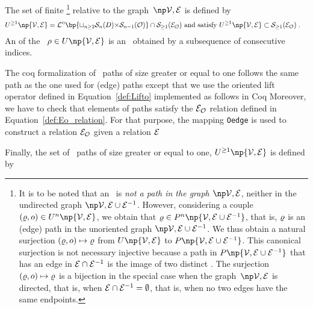 \documentclass[12pt]{article}
\begin{document}
{{{The set of finite \undirectedEdgePaths\footnote{%
  It is to be noted that an \undirectedEdgePath\ is \emph{not a path in the graph
    $\npOrientedGraph$}, neither in the undirected graph $\npUnorientedGraph$.
  However, considering a couple $(\path,\orient)\in \UPATH^n\np{\OrientedGraph}$, we obtain that
  $\path \in \PATH^n\np{\UnorientedGraph}$,
  that is, $\varrho$ is an (edge) path in the unoriented graph
  \( \npUnorientedGraph \).
  We thus obtain a natural surjection
  $(\varrho,o)\mapsto \varrho$
    from $\UPATH\np{\OrientedGraph}$ to $\PATH\np{\UnorientedGraph}$.
    This canonical surjection is not necessary injective because
    a path in $\PATH\np{\UnorientedGraph}$ that has an edge in ${\cal E} \cap {\cal E}^{-1}$
    is the image of two distinct \undirectedEdgePaths.
    The surjection $(\varrho,o)\mapsto \varrho$ 
    is a bijection in the special case when 
    the graph~\( \npOrientedGraph \) is directed,
    that is, when ${\cal E} \cap {\cal E}^{-1}=\emptyset$, that is, 
    when no two edges have the same endpoints. 
  }
  relative to the graph~$\npOrientedGraph$ 
  is defined by
\begin{align}
  \UPATH^{\ge 1}\np{\OrientedGraph}
  &=
    \Lifto \bp{\sqcup_{n\ge 2} \Sequence_{n}(\Set){\times}\Sequence_{n-1}(\Orientation)}
    \cap \Sequence_{\ge 1}(\EDGEo)
    \text{ and satisfy } \UPATH^{\ge 1}\np{\OrientedGraph}  \subset \Sequence_{\ge 1}(\EDGEo) 
    \eqfinp
    \label{def:eopaths_gt1}
\end{align}
An \emph{\undirectedEdgeSubPath} of the \undirectedEdgePath~$\UndirectedPath
\in\UPATH\np{\OrientedGraph}$ is an \undirectedEdgePath\ obtained by a
subsequence of consecutive indices. 

The coq formalization of \undirectedEdgePaths\ paths of size greater or equal to
one follows the same path as the one used for (edge) paths except that we use
the oriented lift operator defined in Equation~\eqref{def:Lifto} implemented as 
follows in Coq
{\small {}}
Moreover, we have to
check that elements of paths satisfy the ${{\cal E}}_{\cal O}$ relation defined in
Equation~\eqref{def:Eo_relation}. For that purpose,  the mapping \texttt{Oedge} is used to
construct a relation ${{\cal E}}_{\cal O}$ given a relation ${\cal E}$
{\small {}
Finally, the set of
\undirectedEdgePaths\ paths of size greater or equal to one,
$\UPATH^{\ge 1}\np{\OrientedGraph}$ is defined by

\medskip

}}}}
\end{document}
